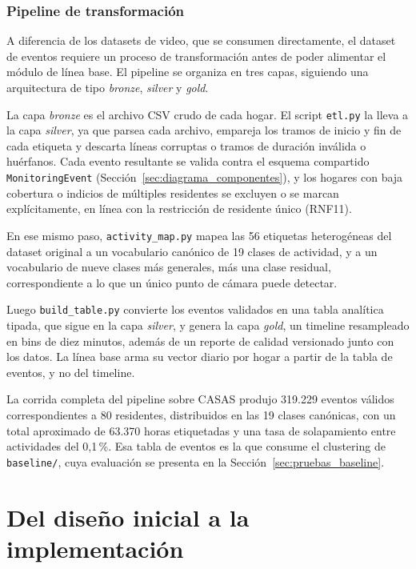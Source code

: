 \subsubsection*{Pipeline de transformación}

A diferencia de los datasets de video, que se consumen directamente, el dataset de eventos requiere un proceso de transformación antes de poder alimentar el módulo de línea base.
El pipeline se organiza en tres capas, siguiendo una arquitectura de tipo \textit{bronze}, \textit{silver} y \textit{gold}.

La capa \textit{bronze} es el archivo CSV crudo de cada hogar.
El script \texttt{etl.py} la lleva a la capa \textit{silver}, ya que parsea cada archivo, empareja los tramos de inicio y fin de cada etiqueta y descarta líneas corruptas o tramos de duración inválida o huérfanos.
Cada evento resultante se valida contra el esquema compartido \texttt{MonitoringEvent} (Sección~\ref{sec:diagrama_componentes}), y los hogares con baja cobertura o indicios de múltiples residentes se excluyen o se marcan explícitamente, en línea con la restricción de residente único (RNF11).

En ese mismo paso, \texttt{activity\_map.py} mapea las 56 etiquetas heterogéneas del dataset original a un vocabulario canónico de 19 clases de actividad, y a un vocabulario de nueve clases más generales, más una clase residual, correspondiente a lo que un único punto de cámara puede detectar.

Luego \texttt{build\_table.py} convierte los eventos validados en una tabla analítica tipada, que sigue en la capa \textit{silver}, y genera la capa \textit{gold}, un timeline resampleado en bins de diez minutos, además de un reporte de calidad versionado junto con los datos.
La línea base arma su vector diario por hogar a partir de la tabla de eventos, y no del timeline.

La corrida completa del pipeline sobre CASAS produjo 319.229 eventos válidos correspondientes a 80 residentes, distribuidos en las 19 clases canónicas, con un total aproximado de 63.370 horas etiquetadas y una tasa de solapamiento entre actividades del 0,1\,\%.
Esa tabla de eventos es la que consume el clustering de \texttt{baseline/}, cuya evaluación se presenta en la Sección~\ref{sec:pruebas_baseline}.

\section{Del diseño inicial a la implementación}
\label{sec:evolucion_diseno}

